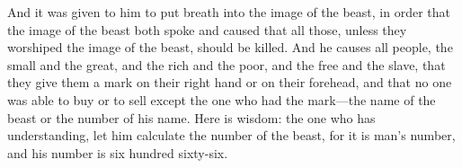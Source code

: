 \begin{biblechapter}
\verse And it was given to him to put breath into the image of the beast, in order that the image of the beast both spoke and caused that all those, unless they worshiped the image of the beast, should be killed.
\verse And he causes all people, the small and the great, and the rich and the poor, and the free and the slave, that they give them a mark on their right hand or on their forehead,
\verse and that no one was able to buy or to sell except the one who had the mark—the name of the beast or the number of his name.
\verse Here is wisdom: the one who has understanding, let him calculate the number of the beast, for it is man’s number, and his number is six hundred sixty-six.
\end{biblechapter}

